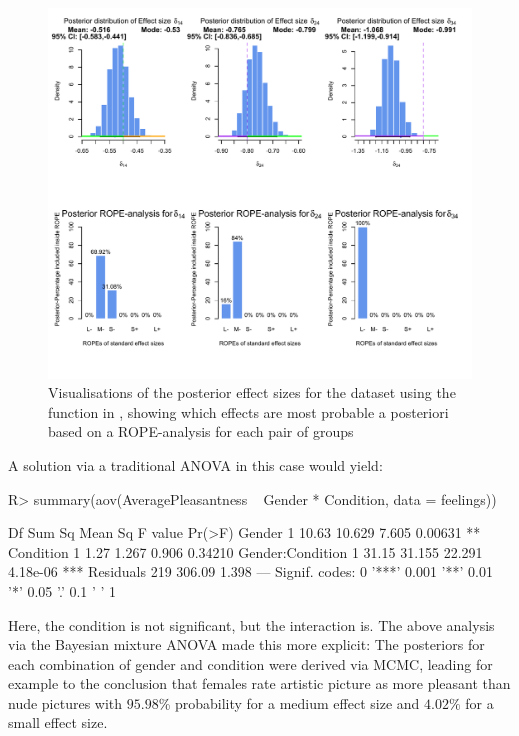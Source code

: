 \begin{figure}[h!]
\centering
\includegraphics[width=1\textwidth]{histFL1}
\caption{Visualisations of the posterior effect sizes for the  dataset using the  function in , showing which effects are most probable a posteriori based on a ROPE-analysis for each pair of groups}
\label{fig:plotFL2}
\end{figure}

A solution via a traditional ANOVA in this case would yield:
\begin{example}
R> summary(aov(AveragePleasantness ~ Gender * Condition, data = feelings))

                  Df Sum Sq Mean Sq F value   Pr(>F)    
Gender             1  10.63  10.629   7.605  0.00631 ** 
Condition          1   1.27   1.267   0.906  0.34210    
Gender:Condition   1  31.15  31.155  22.291 4.18e-06 ***
Residuals        219 306.09   1.398                     
---
Signif. codes:  0 '***' 0.001 '**' 0.01 '*' 0.05 '.' 0.1 ' ' 1
\end{example}
Here, the condition is not significant, but the interaction is. The above analysis via the Bayesian mixture ANOVA made this more explicit: The posteriors for each combination of gender and condition were derived via MCMC, leading for example to the conclusion that females rate artistic picture as more pleasant than nude pictures with $95.98$\% probability for a medium effect size and $4.02\%$ for a small effect size.


